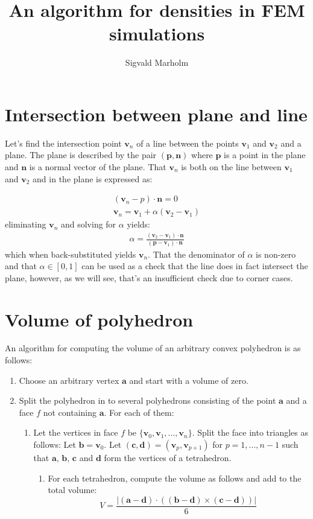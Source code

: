 \documentclass[12pt]{article}
\title{An algorithm for densities in FEM simulations}
\author{Sigvald Marholm}
\renewcommand{\vec}{\mathbf}
\begin{document}
\maketitle
\pagebreak

\section{Intersection between plane and line}
Let's find the intersection point $\vec v_n$ of a line between the points $\vec v_1$ and $\vec v_2$ and a plane. The plane is described by the pair $(\vec p,\vec n)$ where $\vec p$ is a point in the plane and $\vec n$ is a normal vector of the plane. That $\vec v_n$ is both on the line between $\vec v_1$ and $\vec v_2$ and in the plane is expressed as:

\begin{align}
	(\vec v_n-p)\cdot\vec n=0 \\
	\vec v_n=\vec v_1+\alpha(\vec v_2-\vec v_1)
\end{align}
eliminating $\vec v_n$ and solving for $\alpha$ yields:
\begin{align}
	\alpha=\frac{(\vec v_2-\vec v_1)\cdot\vec n}{(\vec p-\vec v_1)\cdot\vec n}
\end{align}
which when back-substituted yields $\vec v_n$. That the denominator of $\alpha$ is non-zero and that $\alpha\in[0,1]$ can be used as a check that the line does in fact intersect the plane, however, as we will see, that's an insufficient check due to corner cases.

\section{Volume of polyhedron}
An algorithm for computing the volume of an arbitrary convex polyhedron is as follows:
\begin{enumerate}
	\item Choose an arbitrary vertex $\vec a$ and start with a volume of zero.
	\item Split the polyhedron in to several polyhedrons consisting of the point $\vec a$ and a face $f$ not containing $\vec a$. For each of them:
	\begin{enumerate}
		\item Let the vertices in face $f$ be $\{\vec v_0, \vec v_1,...,\vec v_n\}$. Split the face into triangles as follows: Let $\vec b=\vec v_0$. Let $(\vec c,\vec d)=(\vec v_p,\vec v_{p+1})$ for $p=1,...,n-1$ such that $\vec a$, $\vec b$, $\vec c$ and $\vec d$ form the vertices of a tetrahedron.
			\begin{enumerate}
				\item For each tetrahedron, compute the volume as follows and add to the total volume:
				\begin{equation}
					V = \frac{|(\vec a-\vec d)\cdot((\vec b-\vec d)\times(\vec c-\vec d))|}{6}
				\end{equation}
			\end{enumerate}
	\end{enumerate}
\end{enumerate}
\end{document}
